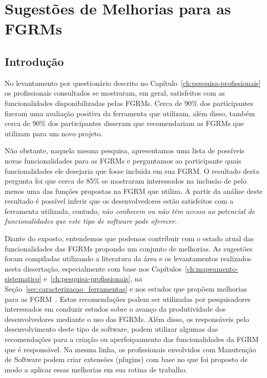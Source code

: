 \chapter{Sugestões de Melhorias para as FGRMs}
\label{ch:sug_melhoria}

\section{Introdução}
\label{sec:sug_melhoria_intro}

No levantamento por questionário descrito no
Capítulo~\ref{ch:pesquisa-profissionais} os profissionais consultados se
mostraram, em geral, satisfeitos com as funcionalidades disponibilizadas pelas
FGRMs. Cerca de 90\% dos par\-ti\-ci\-pan\-tes fizeram uma avaliação positiva da
ferramenta que utilizam, além disso, também cerca de 90\% dos participantes
disseram que recomendariam as FGRMs que utilizam para um novo projeto.

Não obstante, naquela mesma pesquisa, apresentamos uma lista de possíveis novas
funcionalidades para as FGRMs e perguntamos ao participante quais
funcionalidades ele desejaria que fosse incluída  em sua FGRM\@. O resultado
desta pergunta foi que cerca de 85\% se mostraram interessados na inclusão de
pelo menos uma das funções propostas na FGRM que utiliza. A partir da análise
deste resultado é possível inferir que os desenvolvedores estão satisfeitos com
a ferramenta utilizada, contudo, \textit{não conhecem ou não têm acesso ao
    potencial de funcionalidades que este tipo de software pode oferecer}.

Diante do exposto, entendemos que podemos contribuir com o estado a\-tu\-al das
funcionalidades das FGRMs propondo um conjunto de melhorias. As sugestões foram
compiladas utilizando a literatura da área e os levantamentos realizados nesta
dissertação, especialmente com base nos
Capítulos~\ref{ch:mapeamento-sistematico} e~\ref{ch:pesquisa-profissionais}, na
Seção~\ref{sec:caracterizacao_ferramentas} e nos estudos que propõem melhorias
para as FGRM~\cite{zimmermann2009improving, bettenburg2008makes, singh2011bug}.
Estas recomendações podem ser utilizadas por pesquisadores interessados em
conduzir estudos sobre o avanço da produtividade dos desenvolvedores mediante o
uso das FGRMs. Além disso, os responsáveis pelo desenvolvimento deste tipo de
software, podem utilizar algumas das recomendações para a criação ou
aperfeiçoamento das funcionalidades da FGRM que é responsável. Na mesma linha,
os profissionais envolvidos com Manutenção de Software podem criar extensões
(plugins) com base no que foi proposto de modo a aplicar essas melhorias em sua
rotina de trabalho.

